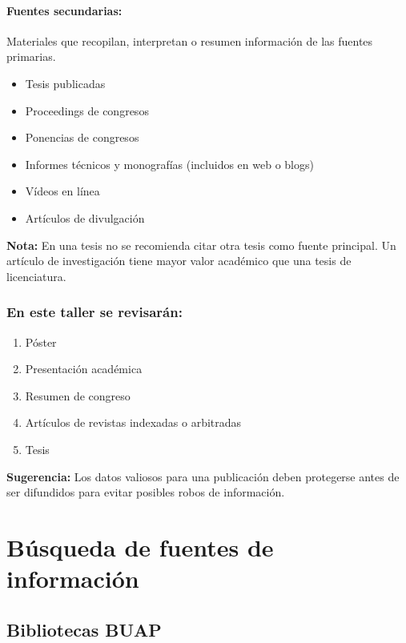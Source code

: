 \documentclass{article}
\begin{document}
\paragraph{Fuentes secundarias:}  
Materiales que recopilan, interpretan o resumen información de las fuentes primarias.
\begin{itemize}
	\item Tesis publicadas
	\item Proceedings de congresos
	\item Ponencias de congresos
	\item Informes técnicos y monografías (incluidos en web o blogs)
	\item Vídeos en línea
	\item Artículos de divulgación
\end{itemize}

\textbf{Nota:} En una tesis no se recomienda citar otra tesis como fuente principal. Un artículo de investigación tiene mayor valor académico que una tesis de licenciatura.

\subsubsection{En este taller se revisarán:}
\begin{enumerate}
	\item Póster
	\item Presentación académica
	\item Resumen de congreso
	\item Artículos de revistas indexadas o arbitradas
	\item Tesis
\end{enumerate}

\textbf{Sugerencia:} Los datos valiosos para una publicación deben protegerse antes de ser difundidos para evitar posibles robos de información. \vspace{0.5cm}

\section{Búsqueda de fuentes de información} \vspace{0.5cm}

\subsection{Bibliotecas BUAP} \vspace{0.5cm}
\end{document}
